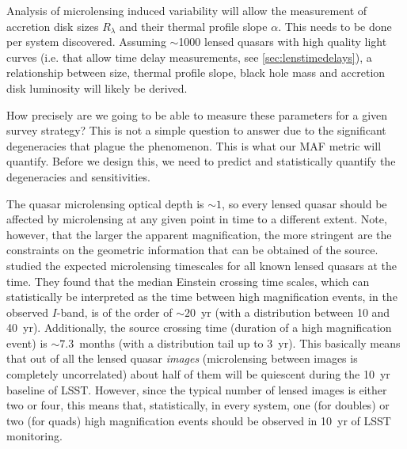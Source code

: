 Analysis of microlensing induced variability will allow the measurement of
accretion disk sizes $R_\lambda$ and their thermal profile slope $\alpha$. This
needs to be done per system discovered. Assuming $\sim$1000 lensed quasars with
high quality light curves (i.e. that allow time delay measurements, see
\autoref{sec:lenstimedelays}), a relationship between size, thermal profile
slope, black hole mass and accretion disk luminosity will likely be derived.

How precisely are we going to be able to measure these parameters for a given
survey strategy? This is not a simple question to answer due to the significant
degeneracies that plague the phenomenon. This is what our MAF metric will
quantify. Before we design this, we need to predict and statistically quantify
the degeneracies and sensitivities.


The quasar microlensing optical depth is $\sim1$, so every lensed quasar should
be affected by microlensing at any given point in time to a different extent.
Note, however, that the larger the apparent magnification, the more stringent are
the constraints on the geometric information that can be obtained of the source.
\citet{MosqueraandKochanek2011} studied the expected microlensing
timescales for all known lensed quasars at the time. They found that the median
Einstein crossing time scales, which can statistically be interpreted as the
time between high magnification events, in the observed $I$-band, is of the order
of $\sim20$~yr (with a distribution between 10 and 40~yr). Additionally, the source
crossing time (duration of a high magnification event) is $\sim7.3$~months (with
a distribution tail up to 3~yr). This basically means that out of all the lensed
quasar {\em images} (microlensing between images is completely uncorrelated)
about half of them will be quiescent during the 10~yr baseline of LSST. However,
since the typical number of lensed images is either two or four, this means
that, statistically, in every system, one (for doubles) or two (for quads) high
magnification events should be observed in 10~yr of LSST monitoring.

